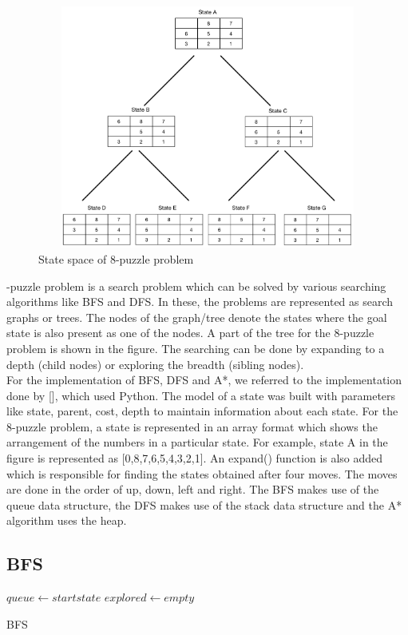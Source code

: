 \documentclass{svproc}
\begin{document}
\begin{figure}
	\centering
	\includegraphics[width=12cm,height=8cm,keepaspectratio]{ExampleState.png}
	\caption{State space of 8-puzzle problem}
	\label{fig:2}       %
\end{figure}

-puzzle problem is a search problem which can be solved by various searching algorithms like BFS and DFS. In these, the problems are represented as search graphs or trees. The nodes of the graph/tree denote the states where the goal state is also present as one of the nodes. A part of the tree for the 8-puzzle problem is shown in the figure. The searching can be done by expanding to a depth (child nodes) or exploring the breadth (sibling nodes). \\

\noindent For the implementation of BFS, DFS and A*, we referred to the implementation done by [], which used Python. The model of a state was built with parameters like state, parent, cost, depth to maintain information about each state. For the 8-puzzle problem, a state is represented in an array format which shows the arrangement of the numbers in a particular state. For example, state A in the figure is represented as [0,8,7,6,5,4,3,2,1]. An expand() function is also added which is responsible for finding the states obtained after four moves. The moves are done in the order of up, down, left and right. The BFS makes use of the queue data structure, the DFS makes use of the stack data structure and the A* algorithm uses the heap.  \\

\subsection{BFS}
\setlength{\intextsep}{5pt}
\begin{algorithm}
	\SetAlgoLined
	 $queue \gets start state$\;
	 $explored \gets empty$\;
	\caption{BFS}
\end{algorithm}
\end{document}
